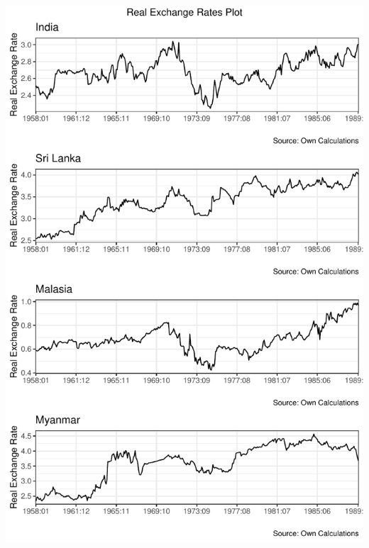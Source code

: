 \documentclass[11pt,preprint, authoryear]{elsarticle}
\numberwithin{equation}{section}
\numberwithin{figure}{section}
\numberwithin{table}{section}
\begin{document}
\begin{center}\includegraphics{20346212_files/figure-latex/Figure1-1} \end{center}
\end{document}
